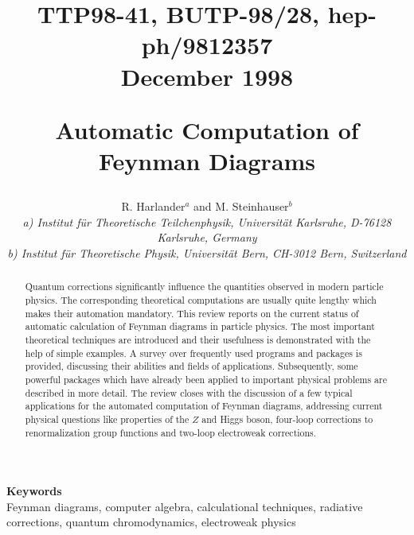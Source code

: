 
\title{
  \vspace{1em}
  \begin{flushright}
    {\bf\normalsize
    TTP98-41, BUTP-98/28, hep-ph/9812357}\\[-.5em]
    {\bf\normalsize December 1998}\\[1em]
  \end{flushright}
  \Large \sc
  Automatic Computation of Feynman Diagrams
  }

\author{{\sc R. Harlander}$^a$ and {\sc M. Steinhauser}$^b$
  \\[3em]
  {\it a) Institut f\"ur Theoretische Teilchenphysik,
      Universit\"at Karlsruhe, D-76128 Karlsruhe, Germany}
  \\[.5em]
  {\it b) Institut f\"ur Theoretische Physik, Universit\"at
      Bern, CH-3012 Bern, Switzerland}
}

\date{}
\maketitle

\begin{abstract} 
  \noindent
  Quantum corrections significantly influence the quantities observed in
  modern particle physics. The corresponding theoretical computations
  are usually quite lengthy which makes their automation mandatory.
  This review reports on the current status of automatic calculation
  of Feynman diagrams in particle physics.  The most important
  theoretical techniques are introduced and their usefulness is
  demonstrated with the help of simple examples. A survey over
  frequently used programs and packages is provided, discussing their
  abilities and fields of applications.  Subsequently, some powerful
  packages which have already been applied to important physical
  problems are described in more detail. The review closes with the
  discussion of a few typical applications for the automated computation
  of Feynman diagrams, addressing current physical questions like
  properties of the $Z$ and Higgs boson, four-loop corrections to
  renormalization group functions and two-loop electroweak corrections.
\end{abstract}

\begin{center}
  {\bf\small Keywords}\\
  {\small Feynman diagrams, computer algebra, calculational techniques,
  radiative corrections, quantum chromodynamics, electroweak physics}
\end{center}
